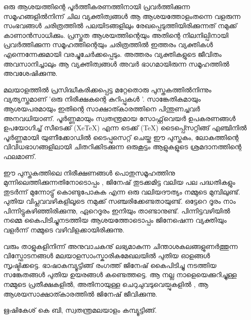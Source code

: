 
ഒരു ആശയത്തിന്റെ പൂര്‍ത്തീകരണത്തിനായി പ്രവര്‍ത്തിക്കുന്ന സമൂഹങ്ങളില്‍നിന്ന് ചില വ്യക്തിത്വങ്ങള്‍ ആ ആശയത്തോളംതന്നെ
വളരുന്ന സംഭവങ്ങള്‍ ചരിത്രത്തില്‍ പലയിടങ്ങളിലും  രേഖപ്പെടുത്തിയിരിക്കുന്നത് നമുക്ക് കാണാന്‍സാധിക്കും. പ്രസ്തുത ആശയത്തിന്റെയും  
അതിന്റെ നിലനില്പിനായി പ്രവര്‍ത്തിക്കുന്ന സമൂഹത്തിന്റെയും  ചരിത്രത്തില്‍ ഇത്തരം  വ്യക്തികള്‍ എന്നെന്നേക്കുമായി വരച്ചുചേര്‍ക്കപ്പെടും. 
അത്തരം വ്യക്തികളുടെ ജീവിതം അവസാനിച്ചാലും ആ വ്യക്തിത്വങ്ങള്‍ അവര്‍ ഭാഗമായിരുന്ന സമൂഹത്തില്‍ അവശേഷിക്കുന്നു. 


മലയാളത്തില്‍ പ്രസിദ്ധീകരിക്കപ്പെട്ട മറ്റേതൊരു പുസ്തകത്തില്‍നിന്നും വ്യത്യസ്തമാണ് 'ഒരു നിരീക്ഷകന്റെ കുറിപ്പുകള്‍ '. 
സാങ്കേതികമായും ആശയപരമായും ഇതിന്റെ സാക്ഷാത്കാരത്തിനെ പിന്തുണച്ചവര്‍ അനവധിയാണ്. പൂര്‍ണ്ണമായും സ്വതന്ത്രമായ 
സോഫ്റ്റ്‌‌വെയര്‍ ഉപകരണങ്ങള്‍ ഉപയോഗിച്ച് സീടെക്ക് (XeTeX) എന്ന ടെക്ക് (TeX) ടൈപ്പ്സെറ്റിങ്ങ് എഞ്ചിനില്‍ പൂര്‍ണ്ണമായി യുണീക്കോഡില്‍ ടൈപ്പുസെറ്റ് ചെയ്ത
ഈ പുസ്തകം, ലോകത്തിന്റെ വിവിധഭാഗങ്ങളിലായി ചിതറിക്കിടക്കുന്ന ഒരുകൂട്ടം ആളുകളുടെ ശ്രമദാനത്തിന്റെ ഫലമാണ്.   

ഈ പുസ്തകത്തിലെ നിരീക്ഷണങ്ങള്‍ പൊതുസമൂഹത്തിനു മുന്നിലെത്തിക്കുന്നതിനോടൊപ്പം , ജിനേഷ് തുടക്കമിട്ട വലിയ പല പദ്ധതികളും  
തുടര്‍ന്ന് മുന്നോട്ടു് കൊണ്ടുപോകുക എന്ന ഒരു വലിയദൗത്യം  നമ്മുടെ മുമ്പിലുണ്ട്. പുതിയ വിപ്ലവവഴികളിലൂടെ നമുക്ക് സഞ്ചരിക്കേണ്ടതായുണ്ട്. 
ഒട്ടേറെ ദൂരം നാം പിന്നിട്ടുകഴിഞ്ഞിരിക്കുന്നു, ഏറെദൂരം ഇനിയും താണ്ടാനുണ്ട്. പിന്നിട്ടവഴിയില്‍ നമ്മെ കൈപിടിച്ചുനടത്തിയ ആശയത്തോടൊപ്പം  
ജിനേഷെന്ന വ്യക്തിയും  വളര്‍ന്ന് നമ്മുടെ വഴിവിളക്കായിരിക്കുന്നു.

വരും  താളുകളിനിന്ന് അനുവാചകനു് ലഭ്യമാകുന്ന ചിന്താശകലങ്ങളുണര്‍ത്തുന്ന വിസ്ഫോടനങ്ങള്‍ മലയാളസാംസ്കാരികമേഖലയില്‍ പുതിയ ഓളങ്ങള്‍ സൃഷ്ടിക്കട്ടെ. 
ഭാഷാകമ്പ്യൂട്ടിങ്ങ് രംഗത്ത് ജിനേഷ് കൈപിടിച്ചു നടത്തിയ സങ്കേതങ്ങള്‍ പുതിയ ഉയരങ്ങള്‍ കണ്ടെത്തട്ടെ.  ആ നല്ല നാളെയെക്കുറിച്ചുള്ള നമ്മുടെ പ്രതീക്ഷകളില്‍,
അതിനായുള്ള ചെറുചുവടുവെയ്പുകളില്‍ , ആ ആശയസാക്ഷാത്കാരത്തില്‍ ജിനേഷ് ജീവിക്കുന്നു. 

\hspace*{2em}ഋഷികേശ് കെ ബി,  സ്വതന്ത്രമലയാളം കമ്പ്യൂട്ടിങ്ങ്. 
\newpage



